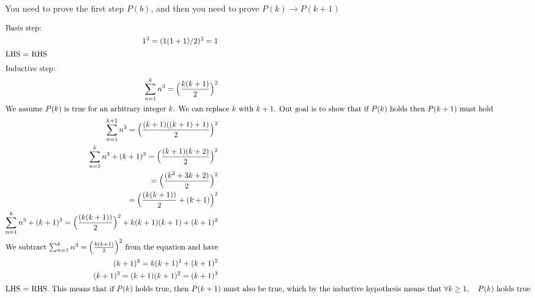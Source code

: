 \documentclass[12pt]{article}
\begin{document}
        You need to prove the first step $P(b)$, and then you need to prove
            $P(k) \rightarrow P(k+1)$
    
                    \begin{align}
                        \intertext{Basis step:}
                        1^3 = (1(1+1)/2)^2 = 1 \\
                        \intertext{LHS = RHS}
                        \intertext{Inductive step:}
                        \sum_{n=1}^k{n^3} = \Big(\frac{k(k+1)}{2}\Big)^2 \\ %
                        \intertext{We assume $P(k)$ is true for an arbitrary integer $k$. We can replace $k$ with $k+1$. Out goal is to show that if $P(k)$ holds then $P(k+1)$ must hold}
                        \sum_{n=1}^{k+1}{n^3} = \Big(\frac{(k+1)((k+1)+1)}{2}\Big)^2 \\
                        \sum_{n=1}^{k}{n^3} + (k+1)^3 = \Big(\frac{(k+1)(k+2)}{2}\Big)^2 \\
                        = \Big(\frac{(k^2+3k+2)}{2}\Big)^2 \\
                        = \Big(\frac{(k(k+1))}{2} + (k+1)\Big)^2 \\
                        \sum_{n=1}^{k}{n^3} + (k+1)^3 = \Big(\frac{(k(k+1))}{2}\Big)^2 + k(k+1)(k+1) + (k+1)^2 \\
                        \intertext{We subtract  $\sum_{n=1}^k{n^3} = \Big(\frac{k(k+1)}{2}\Big)^2$ from the equation and have}
                        (k+1)^3 = k(k+1)^2 + (k+1)^2 \\
                        (k+1)^3 = (k+1)(k+1)^2 = (k+1)^3 \\
                        \intertext{LHS = RHS. This means that if $P(k)$ holds true,
                        then $P(k+1)$ must also be true, which by the inductive
                        hypothesis means that $\forall k \geq 1, \quad P(k)$ holds true}
                    \end{align}
\end{document}
